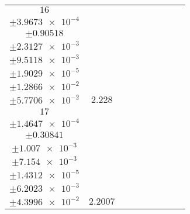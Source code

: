 \documentclass[8pt]{article}
\begin{document}
\begin{longtable}[l]{c c c c c c c c c}
$\num{16}$ & \begin{tabular}[c]{@{}c@{}}$\num{2.7673e-2}$ \\ $\pm\num{3.9673e-4}$\end{tabular} & \begin{tabular}[c]{@{}c@{}}$\num{0.25509}$ \\ $\pm\num{0.90518}$\end{tabular} & \begin{tabular}[c]{@{}c@{}}$\num{0.85451}$ \\ $\pm\num{2.3127e-3}$\end{tabular} & \begin{tabular}[c]{@{}c@{}}$\num{3.6275e+3}$ \\ $\pm\num{9.5118e-3}$\end{tabular} & \begin{tabular}[c]{@{}c@{}}$\num{7.257}$ \\ $\pm\num{1.9029e-5}$\end{tabular} & \begin{tabular}[c]{@{}c@{}}$\num{1.1411}$ \\ $\pm\num{1.2866e-2}$\end{tabular} & \begin{tabular}[c]{@{}c@{}}$\num{3.9705}$ \\ $\pm\num{5.7706e-2}$\end{tabular} & $\num{2.228}$\\
$\num{17}$ & \begin{tabular}[c]{@{}c@{}}$\num{2.7894e-2}$ \\ $\pm\num{1.4647e-4}$\end{tabular} & \begin{tabular}[c]{@{}c@{}}$\num{0.64631}$ \\ $\pm\num{0.30841}$\end{tabular} & \begin{tabular}[c]{@{}c@{}}$\num{7.0267}$ \\ $\pm\num{1.007e-3}$\end{tabular} & \begin{tabular}[c]{@{}c@{}}$\num{3.6336e+3}$ \\ $\pm\num{7.154e-3}$\end{tabular} & \begin{tabular}[c]{@{}c@{}}$\num{7.2693}$ \\ $\pm\num{1.4312e-5}$\end{tabular} & \begin{tabular}[c]{@{}c@{}}$\num{1.1556}$ \\ $\pm\num{6.2023e-3}$\end{tabular} & \begin{tabular}[c]{@{}c@{}}$\num{3.8933}$ \\ $\pm\num{4.3996e-2}$\end{tabular} & $\num{2.2007}$\\

\end{longtable}
\end{document}

